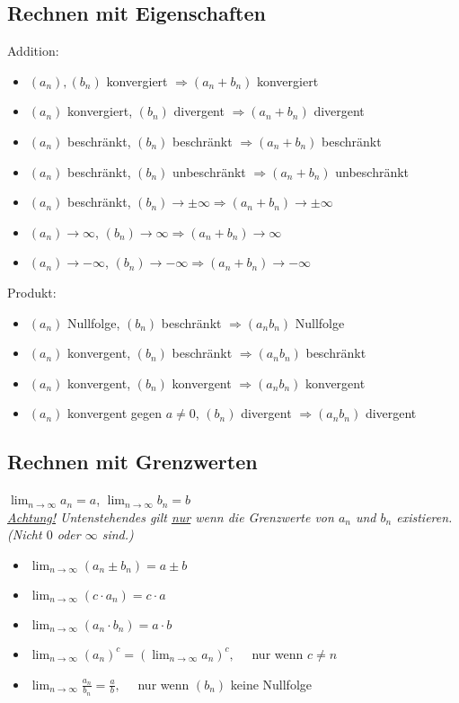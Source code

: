 \subsection{Rechnen mit Eigenschaften}
Addition:
{\small
\begin{itemize}
  \item $(a_n), (b_n)$ konvergiert $\Rightarrow (a_n + b_n)$ konvergiert
  \item $(a_n)$ konvergiert, $(b_n)$ divergent $\Rightarrow (a_n + b_n)$
  divergent
  \item $(a_n)$ beschränkt, $(b_n)$ beschränkt $\Rightarrow (a_n + b_n)$
  beschränkt
  \item $(a_n)$ beschränkt, $(b_n)$ unbeschränkt $\Rightarrow (a_n + b_n)$
  unbeschränkt
  \item $(a_n)$ beschränkt, $(b_n) \to \pm \infty \Rightarrow (a_n + b_n) \to
  \pm \infty$
  \item $(a_n) \to \infty$, $(b_n) \to \infty \Rightarrow (a_n + b_n) \to \infty$
  \item $(a_n) \to -\infty$, $(b_n) \to -\infty \Rightarrow (a_n + b_n) \to
  -\infty$
\end{itemize}
}

Produkt:
{\small
\begin{itemize}
  \item $(a_n)$ Nullfolge, $(b_n)$ beschränkt $\Rightarrow (a_n b_n)$ Nullfolge
  \item $(a_n)$ konvergent, $(b_n)$ beschränkt $\Rightarrow (a_n b_n)$
  beschränkt
  \item $(a_n)$ konvergent, $(b_n)$ konvergent $\Rightarrow (a_n b_n)$
  konvergent
  \item $(a_n)$ konvergent gegen $a \neq 0$, $(b_n)$ divergent $\Rightarrow
  (a_n b_n)$ divergent
\end{itemize}
}

\subsection{Rechnen mit Grenzwerten}
$\lim_{n \to \infty} a_n = a$, $\lim_{n \to \infty} b_n = b$\\
\emph{\underline{Achtung!} Untenstehendes gilt \underline{nur} wenn die Grenzwerte von $a_n$ und $b_n$ existieren. (Nicht $0$ oder $\infty$ sind.)}
\begin{itemize}
  \item $\lim_{n \to \infty} (a_n \pm b_n) = a \pm b$
  \item $\lim_{n \to \infty} (c \cdot a_n) = c \cdot a$
  \item $\lim_{n \to \infty} (a_n \cdot b_n) = a \cdot b$
  \item $\lim_{n \to \infty} (a_n)^c = (\lim_{n \to \infty} a_n)^c, \quad$ nur wenn $c \neq n$
  \item $\lim_{n \to \infty} \frac{a_n}{b_n} = \frac{a}{b}, \quad$ nur wenn $(b_n)$ keine Nullfolge
\end{itemize}

